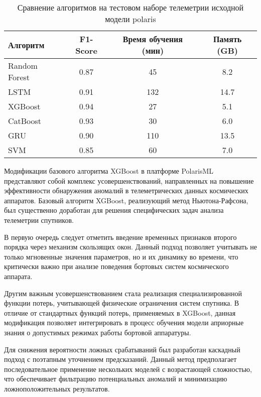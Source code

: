 \begin{table}[H]
	\caption{Сравнение алгоритмов на тестовом наборе телеметрии исходной модели polaris}
	\centering
	\begin{tabular}{|l|c|c|c|}
		\hline
		\textbf{Алгоритм} & \textbf{F1-Score} & \textbf{Время обучения (мин)} & \textbf{Память (GB)} \\
		\hline
		Random Forest     & 0.87              & 45                            & 8.2                  \\
		\hline
		LSTM              & 0.91              & 132                           & 14.7                 \\
		\hline
		XGBoost           & 0.94              & 27                            & 5.1                  \\
		\hline
		CatBoost          & 0.93              & 30                            & 6.0                  \\
		\hline
		GRU               & 0.90              & 110                           & 13.5                 \\
		\hline
		SVM               & 0.85              & 60                            & 7.0                  \\
		\hline
	\end{tabular}
	\label{tab:ml_comparison}
\end{table}

Модификации базового алгоритма XGBoost в платформе PolarisML представляют собой
комплекс усовершенствований, направленных на повышение эффективности обнаружения
аномалий в телеметрических данных космических аппаратов. Базовый алгоритм
XGBoost, реализующий метод Ньютона-Рафсона, был существенно доработан для
решения специфических задач анализа телеметрии спутников.

В первую очередь следует отметить введение временных признаков второго порядка
через механизм скользящих окон. Данный подход позволяет учитывать не только
мгновенные значения параметров, но и их динамику во времени, что критически
важно при анализе поведения бортовых систем космического аппарата.

Другим важным усовершенствованием стала реализация специализированной функции
потерь, учитывающей физические ограничения систем спутника. В отличие от
стандартных функций потерь, применяемых в XGBoost, данная модификация позволяет
интегрировать в процесс обучения модели априорные знания о допустимых режимах
работы бортовой аппаратуры.

Для снижения вероятности ложных срабатываний был разработан каскадный подход с
поэтапным уточнением предсказаний. Данный метод предполагает последовательное
применение нескольких моделей с возрастающей сложностью, что обеспечивает
фильтрацию потенциальных аномалий и минимизацию ложноположительных результатов.

